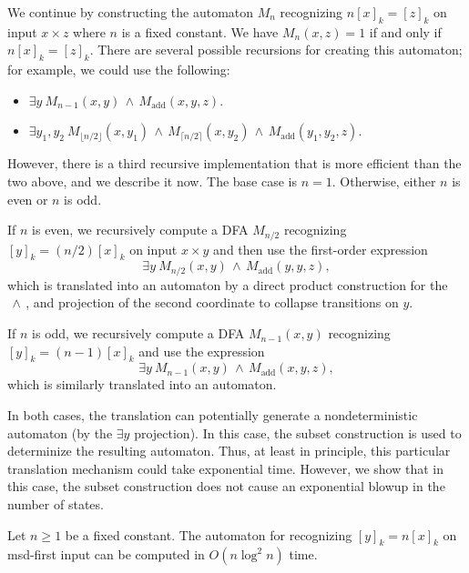 \documentclass[12pt,reqno]{article}
\def\AND{\, \wedge \,}
\def\add{\text{add}}
\begin{document}
We continue by constructing the automaton $M_n$ recognizing $n[x]_k = [z]_k$ on input $x\times z$ where $n$ is a fixed constant. We have $M_n(x, z)=1$ if and only if $n[x]_k = [z]_k$.
There are several possible recursions for creating this automaton; for example, we could use the following:
\begin{itemize} [nosep]
    \item $\exists y \ M_{n-1}(x,y) \AND M_{\add}(x, y, z)$.
    \item  $\exists y_1, y_2 \ M_{\lfloor n/2 \rfloor}(x,y_1) \AND M_{\lceil n/2 \rceil}(x,y_2) \AND M_{\add}(y_1, y_2, z)$.
\end{itemize}
However, there is a third recursive implementation that is more efficient than the two above, and we describe it now.
The base case is $n = 1$.  Otherwise, either $n$ is even or $n$ is odd.

If $n$ is even, we
recursively compute a DFA $M_{n/2}$ recognizing $[y]_k =  (n/2)[x]_k$ on input $x \times y$
and then use the first-order expression
$$ \exists y \ M_{n/2}(x,y) \AND M_{\add}(y, y, z),$$
which is translated into an automaton by a direct product construction
for the $\AND$, and projection of the second coordinate to collapse
transitions on $y$. 

If $n$ is odd, we recursively compute
a DFA $M_{n-1}(x,y)$ recognizing $[y]_k = (n-1)[x]_k$ and use the expression
$$ \exists y \ M_{n-1}(x,y) \AND M_{\add}(x, y, z),$$
which is similarly translated into an automaton.

In both cases, the translation can potentially generate a nondeterministic automaton (by the $\exists y$ projection).  In this case, the subset construction is used to determinize the resulting automaton. Thus, at least in principle, this particular translation mechanism could take exponential time.
However,  we show that in this case, the subset construction does not cause an exponential blowup in the number of states.

\begin{theorem} \label{theorem:y=n[x]-time}
    Let $n \geq 1$ be a fixed constant.
    The automaton for recognizing $[y]_k = n[x]_k$ on msd-first input can be computed in $O(n \log^2 n)$ time. 
\end{theorem}
\end{document}
